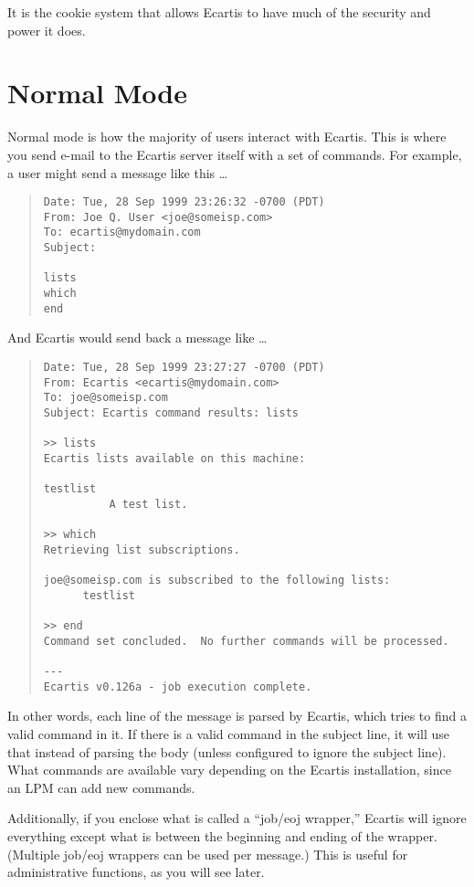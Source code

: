 \documentclass{book}
\begin{document}
It is the cookie system that allows Ecartis to have much of the security and
power it does.
   
\section{Normal Mode}
\label{interface:normal}

Normal mode is how the majority of users interact with Ecartis.  This is where
you send e-mail to the Ecartis server itself with a set of commands.  For
example, a user might send a message like this \ldots
   
\begin{quote}   
\footnotesize
\begin{verbatim}
Date: Tue, 28 Sep 1999 23:26:32 -0700 (PDT)
From: Joe Q. User <joe@someisp.com>
To: ecartis@mydomain.com
Subject:

lists
which
end
\end{verbatim}
\end{quote}
   
And Ecartis would send back a message like \ldots
   
   
\begin{quote}
\footnotesize
\begin{verbatim}
Date: Tue, 28 Sep 1999 23:27:27 -0700 (PDT)
From: Ecartis <ecartis@mydomain.com>
To: joe@someisp.com
Subject: Ecartis command results: lists

>> lists
Ecartis lists available on this machine:

testlist
          A test list.

>> which
Retrieving list subscriptions.

joe@someisp.com is subscribed to the following lists:
      testlist

>> end
Command set concluded.  No further commands will be processed.

---
Ecartis v0.126a - job execution complete.
\end{verbatim}
\end{quote}   
   
In other words, each line of the message is parsed by Ecartis, which tries to
find a valid command in it.  If there is a valid command in the subject line,
it will use that instead of parsing the body (unless configured to ignore the
subject line).  What commands are available vary depending on the Ecartis
installation, since an LPM can add new commands.
   
Additionally, if you enclose what is called a ``job/eoj wrapper,'' Ecartis
will ignore everything except what is between the beginning and ending of the
wrapper.  (Multiple job/eoj wrappers can be used per message.)  This is useful
for administrative functions, as you will see later.
   
\end{document}
